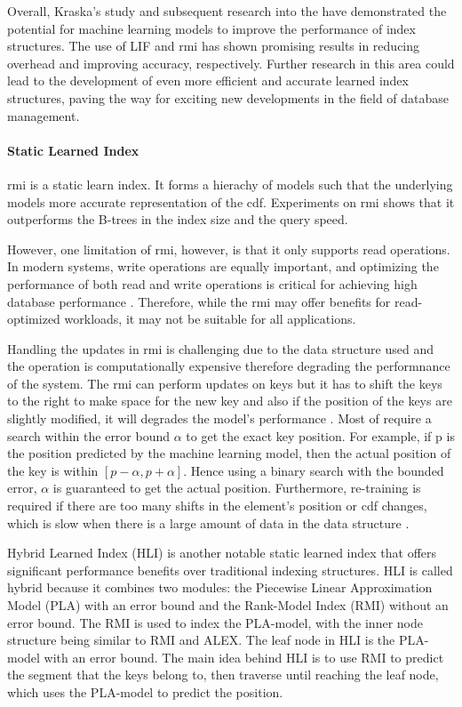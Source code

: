 Overall, Kraska's study and subsequent research into the \learnindex have demonstrated the potential for machine learning models to improve the performance of index structures. The use of LIF and \acrshort{rmi} has shown promising results in reducing overhead and improving accuracy, respectively. Further research in this area could lead to the development of even more efficient and accurate learned index structures, paving the way for exciting new developments in the field of database management.

\paragraph{Static Learned Index}
\acrshort{rmi} is a static learn index. It forms a hierachy of models such that the underlying models more accurate representation of the \acrshort{cdf}. Experiments on \acrshort{rmi} shows that it outperforms the B-trees in the index size and the query speed. 

However, one limitation of \acrshort{rmi}, however, is that it only supports read operations. In modern systems, write operations are equally important, and optimizing the performance of both read and write operations is critical for achieving high database performance \cite{lourencco2015no}. Therefore, while the \acrshort{rmi} may offer benefits for read-optimized workloads, it may not be suitable for all applications.

Handling the updates in \acrshort{rmi} is challenging due to the data structure used and the operation is computationally expensive therefore degrading the performnance of the system. The \acrshort{rmi} can perform updates on keys but it has to shift the keys to the right to make space for the new key and also if the position of the keys are slightly modified, it will degrades the model's performance \cite{handlingupdates}. Most of \learnindex require a search within the error bound $\alpha$ to get the exact key position. For example, if \textsf{p} is the position predicted by the machine learning model, then the actual position of the key is within $[p-\alpha,p+\alpha]$. Hence using a binary search with the bounded error, $\alpha$ is guaranteed to get the actual position. Furthermore, re-training is required if there are too many shifts in the element's position or \acrshort{cdf} changes, which is slow when there is a large amount of data in the data structure \cite{ALEX}. 

Hybrid Learned Index (HLI) is another notable static learned index that offers significant performance benefits over traditional indexing structures. HLI is called hybrid because it combines two modules: the Piecewise Linear Approximation Model (PLA) with an error bound and the Rank-Model Index (RMI) without an error bound. The RMI is used to index the PLA-model, with the inner node structure being similar to RMI and ALEX. The leaf node in HLI is the PLA-model with an error bound. The main idea behind HLI is to use RMI to predict the segment that the keys belong to, then traverse until reaching the leaf node, which uses the PLA-model to predict the position.

